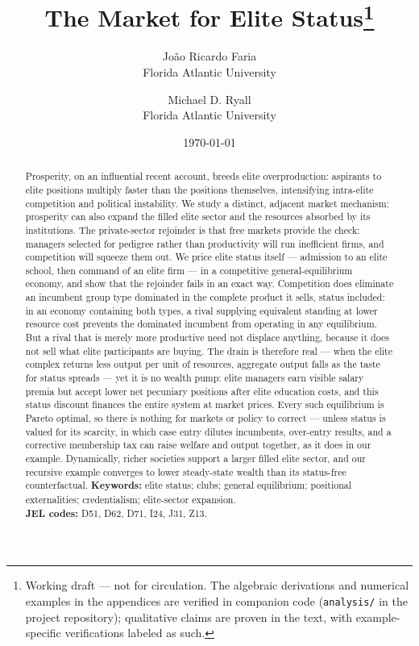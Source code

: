 \documentclass[12pt,letterpaper]{article}
\title{The Market for Elite Status\thanks{Working draft --- not for circulation.
The algebraic derivations and numerical examples in the appendices are verified in companion code (\texttt{analysis/} in the project repository); qualitative claims are proven in the text, with example-specific verifications labeled as such.}}
\author{Jo\~{a}o Ricardo Faria\\ Florida Atlantic University
  \and Michael D. Ryall\\ Florida Atlantic University}
\date{\today}
\theoremstyle{definition}
\begin{document}
\maketitle

\begin{abstract}
\noindent Prosperity, on an influential recent account, breeds elite overproduction: aspirants to elite positions multiply faster than the positions themselves, intensifying intra-elite competition and political instability.
We study a distinct, adjacent market mechanism: prosperity can also expand the filled elite sector and the resources absorbed by its institutions.
The private-sector rejoinder is that free markets provide the check: managers selected for pedigree rather than productivity will run inefficient firms, and competition will squeeze them out.
We price elite status itself --- admission to an elite school, then command of an elite firm --- in a competitive general-equilibrium economy, and show that the rejoinder fails in an exact way.
Competition does eliminate an incumbent group type dominated in the complete product it sells, status included: in an economy containing both types, a rival supplying equivalent standing at lower resource cost prevents the dominated incumbent from operating in any equilibrium.
But a rival that is merely more productive need not displace anything, because it does not sell what elite participants are buying.
The drain is therefore real --- when the elite complex returns less output per unit of resources, aggregate output falls as the taste for status spreads --- yet it is no wealth pump: elite managers earn visible salary premia but accept lower net pecuniary positions after elite education costs, and this status discount finances the entire system at market prices.
Every such equilibrium is Pareto optimal, so there is nothing for markets or policy to correct --- unless status is valued for its scarcity, in which case entry dilutes incumbents, over-entry results, and a corrective membership tax can raise welfare and output together, as it does in our example.
Dynamically, richer societies support a larger filled elite sector, and our recursive example converges to lower steady-state wealth than its status-free counterfactual.
\medskip
\noindent\textbf{Keywords:} elite status; clubs; general equilibrium; positional externalities; credentialism; elite-sector expansion.\\
\textbf{JEL codes:} D51, D62, D71, I24, J31, Z13.
\end{abstract}
\end{document}
